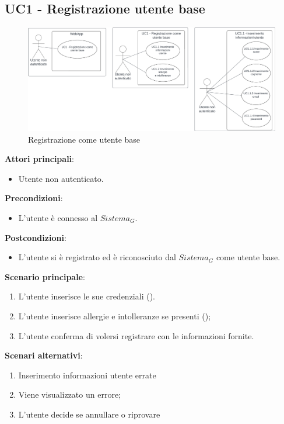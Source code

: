 \subsection{UC1 - Registrazione utente base}\label{usecase:1}
\begin{figure}[H]
  \centering
  \includegraphics[width=0.9\linewidth]{ucd/UCD1_finale.png}
\caption{Registrazione come utente base}
\end{figure}
\textbf{Attori principali}: 
\begin{itemize}
    \item Utente non autenticato.
\end{itemize}
\textbf{Precondizioni}:
\begin{itemize}
    \item L'utente è connesso al $\textit{Sistema}_G$.
\end{itemize}
\textbf{Postcondizioni}: 
\begin{itemize}
    \item L'utente si è registrato ed è riconosciuto dal $\textit{Sistema}_G$ come utente base.
\end{itemize}
\textbf{Scenario principale}:
\begin{enumerate}
    \item L'utente inserisce le sue credenziali ().
    \item L'utente inserisce allergie e intolleranze se presenti ();
    \item L'utente conferma di volersi registrare con le informazioni fornite.
\end{enumerate}
\textbf{Scenari alternativi}:
\begin{enumerate}
    \item Inserimento informazioni utente errate
    \item Viene visualizzato un errore;
    \item L'utente decide se annullare o riprovare
\end{enumerate}

